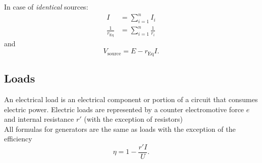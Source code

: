 \documentclass[a4paper,12pt]{article}
\begin{document}
In case of \emph{identical} sources:
\begin{align*}
	I                     & =\sum_{i=1}^{n} I_i           \\
	\frac{1}{r_\text{Eq}} & =\sum_{i=1}^{n} \frac{1}{r_i}
\end{align*}
and
\[
	V_\text{source}=E - r_\text{Eq}I
	.\]

\subsection{Loads}
An electrical load is an electrical component or portion of a circuit that consumes electric power.
Electric loads are represented by a counter electromotive force $e$ and internal resistance $r'$ (with the exception of resistors)\\

All formulas for generators are the same as loads with the exception of the efficiency
\[
	\eta = 1-\frac{r'I}{U}
	.\]
\end{document}
